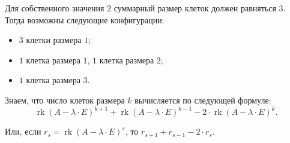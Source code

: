\documentclass[a4paper]{article}
\newcommand{\rk}{\operatorname{rk}}
\begin{document}
\begin{solution}
\begin{options}
        \item 
            Для собственного значения $2$ суммарный размер клеток должен равняться $3$. Тогда возможны следующие конфигурации:
            \begin{itemize}
            \item 
                $3$ клетки размера $1$;
            \item
                $1$ клетка размера $1$, $1$ клетка размера $2$;
            \item 
                $1$ клетка размера $3$.
            \end{itemize}

            Знаем, что число клеток размера $k$ вычисляется по следующей формуле:
            \begin{equation*}
                \rk(A - \lambda \cdot E)^{k + 1} + \rk(A - \lambda \cdot E)^{k - 1} - 2 \cdot \rk(A - \lambda \cdot E)^k.
            \end{equation*}

            Или, если $r_s = \rk(A - \lambda \cdot E)^s$, то $r_{s + 1} + r_{s - 1} - 2 \cdot r_s$.


\end{options}
\end{solution}
\end{document}
